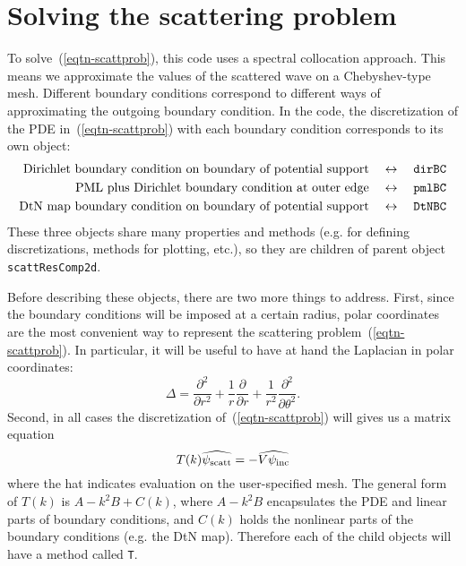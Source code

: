 \section{Solving the scattering problem}

To solve~(\ref{eqtn-scattprob}), this code uses a
spectral collocation approach. This means we approximate the
values of the scattered wave on a Chebyshev-type mesh.
Different
boundary conditions correspond to different ways of
approximating the outgoing boundary condition. 
In the code, the discretization of the
PDE in~(\ref{eqtn-scattprob}) with 
each boundary condition corresponds
to its own object:
\begin{align*}
 \text{Dirichlet boundary condition on boundary of
  potential support}\quad\leftrightarrow\quad{\tt dirBC} \\
 \text{PML plus Dirichlet boundary condition at outer edge}
  \quad\leftrightarrow\quad{\tt pmlBC} \\
 \text{DtN map boundary condition on boundary of potential
  support}\quad\leftrightarrow\quad{\tt DtNBC}
\end{align*}
These three objects share many properties and methods 
(e.g. for defining discretizations, methods for plotting, etc.), 
so they are children of parent object {\tt scattResComp2d}.

Before describing these objects, there are two more things
to address.
First, since the boundary conditions
will be imposed at a certain radius, polar coordinates
are the most convenient way to represent the scattering
problem~(\ref{eqtn-scattprob}). In particular, it will
be useful to have at hand the Laplacian in polar coordinates:
\begin{equation}\label{eqtn-polarlaplacian}
 \Delta = \frac{\partial^2}{\partial r^2} +
          \frac{1}{r} \frac{\partial}{\partial r} +
          \frac{1}{r^2} \frac{\partial^2}{\partial\theta^2}.
\end{equation}
Second, in all cases the discretization of~(\ref{eqtn-scattprob})
will gives us a matrix equation
\begin{equation}\label{eqtn-defT}
 T(k) \widehat{\psi_{\text{scatt}}} = -\widehat{V\psi_{\text{inc}}}
\end{equation}
where the hat indicates evaluation on the user-specified mesh.
The general form of $T(k)$ is $A - k^2 B + C(k)$, where
$A - k^2 B$ encapsulates the PDE and linear parts of
boundary conditions, and $C(k)$ holds the nonlinear parts of
the boundary conditions (e.g. the DtN map). Therefore each
of the child objects will have a method called {\tt T}.
